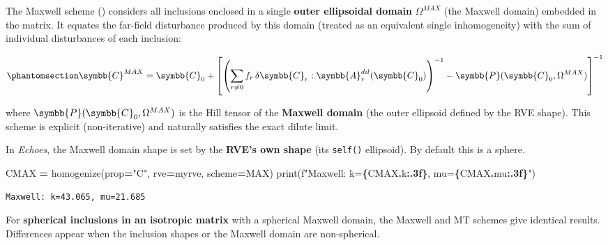 \documentclass[
  a4paper,
  numbers=noendperiod,
  DIV=12]{scrreprt}
\newenvironment{Shaded}{\begin{snugshade}}{\end{snugshade}}
\newcommand{\BuiltInTok}[1]{#1}
\newcommand{\NormalTok}[1]{#1}
\newcommand{\OperatorTok}[1]{\textcolor[rgb]{0.81,0.36,0.00}{\textbf{#1}}}
\newcommand{\SpecialCharTok}[1]{\textcolor[rgb]{0.81,0.36,0.00}{\textbf{#1}}}
\newcommand{\SpecialStringTok}[1]{\textcolor[rgb]{0.31,0.60,0.02}{#1}}
\newcommand{\StringTok}[1]{\textcolor[rgb]{0.31,0.60,0.02}{#1}}
\newcommand{\uuuu}[1]{{\symbb{{#1}}}}
\begin{document}
The Maxwell scheme () considers
all inclusions enclosed in a single \textbf{outer ellipsoidal domain}
\(\Omega^{MAX}\) (the Maxwell domain) embedded in the matrix. It equates
the far-field disturbance produced by this domain (treated as an
equivalent single inhomogeneity) with the sum of individual disturbances
of each inclusion:

\begin{equation}\protect\phantomsection\label{eq-C-max}{
\uuuu{C}^{MAX} = \uuuu{C}_0 + \left[\left(\sum_{r \neq 0} f_r \,\delta\uuuu{C}_r : \uuuu{A}_r^{dil}(\uuuu{C}_0)\right)^{-1} - \uuuu{P}(\uuuu{C}_0, \Omega^{MAX})\right]^{-1}
}\end{equation}

where \(\uuuu{P}(\uuuu{C}_0, \Omega^{MAX})\) is the Hill tensor of the
\textbf{Maxwell domain} (the outer ellipsoid defined by the RVE shape).
This scheme is explicit (non-iterative) and naturally satisfies the
exact dilute limit.

In \emph{Echoes}, the Maxwell domain shape is set by the \textbf{RVE's
own shape} (its \texttt{self()} ellipsoid). By default this is a sphere.

\begin{Shaded}
\begin{Highlighting}[]
\NormalTok{CMAX }\OperatorTok{=}\NormalTok{ homogenize(prop}\OperatorTok{=}\StringTok{"C"}\NormalTok{, rve}\OperatorTok{=}\NormalTok{myrve, scheme}\OperatorTok{=}\NormalTok{MAX)}
\BuiltInTok{print}\NormalTok{(}\SpecialStringTok{f"Maxwell: k=}\SpecialCharTok{\{}\NormalTok{CMAX}\SpecialCharTok{.}\NormalTok{k}\SpecialCharTok{:.3f\}}\SpecialStringTok{, mu=}\SpecialCharTok{\{}\NormalTok{CMAX}\SpecialCharTok{.}\NormalTok{mu}\SpecialCharTok{:.3f\}}\SpecialStringTok{"}\NormalTok{)}
\end{Highlighting}
\end{Shaded}

\begin{verbatim}
Maxwell: k=43.065, mu=21.685
\end{verbatim}

\begin{tcolorbox}[enhanced jigsaw, arc=.35mm, bottomrule=.15mm, bottomtitle=1mm, breakable, colback=white, colbacktitle=quarto-callout-note-color!10!white, colframe=quarto-callout-note-color-frame, coltitle=black, left=2mm, leftrule=.75mm, opacityback=0, opacitybacktitle=0.6, rightrule=.15mm, title=\textcolor{quarto-callout-note-color}{\faInfo}\hspace{0.5em}{Note}, titlerule=0mm, toprule=.15mm, toptitle=1mm]

For \textbf{spherical inclusions in an isotropic matrix} with a
spherical Maxwell domain, the Maxwell and MT schemes give identical
results. Differences appear when the inclusion shapes or the Maxwell
domain are non-spherical.

\end{tcolorbox}
\end{document}
